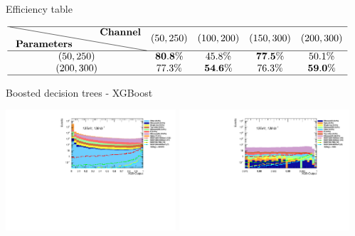 \documentclass[UKenglish]{beamer}
\begin{document}
\begin{frame}{Efficiency table}
    \vfill
    \begin{table}
        \footnotesize
        \centering
        $
        \begin{array}{ccccc}
            \hline \text { \diagbox{\textbf{Parameters}}{\textbf{Channel}} }  & \text {$(50,250)$} & \text {$(100,200)$} & \text {$(150,300)$} & \text {$(200,300)$} \\
            \hline \text {$(50,250)$}   & \text { $\bf{80.8}\%$ } & \text { $45.8\%$ } & \text { $\bf{77.5}\%$ } & \text { $50.1\%$ } \\
            \text {$(200,300)$}   & \text { $77.3\%$ } & \text { $\bf{54.6}\%$ } & \text { $76.3\%$ } & \text { $\bf{59.0}\%$ }\\
            \hline
        \end{array}
        $
    \end{table}
\end{frame}

\begin{frame}{Boosted decision trees - XGBoost}
    \vfill
    \begin{center}
        \includegraphics[width = 0.475\textwidth]{figures/dists/xgbDist.pdf}
        \includegraphics[width = 0.475\textwidth]{figures/dists/xgbDist_C7.pdf}
    \end{center}
\end{frame}
\end{document}

